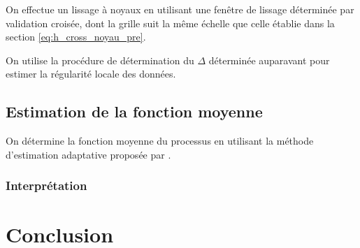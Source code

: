 On effectue un lissage à noyaux en utilisant une fenêtre de lissage déterminée par validation croisée, dont la grille suit la même échelle que celle établie dans la section \ref{eq:h_cross_noyau_pre}.


On utilise la procédure de détermination du $\Delta$ déterminée auparavant pour estimer la régularité locale des données.

\subsection{Estimation de la fonction moyenne}

On détermine la fonction moyenne du processus en utilisant la méthode d'estimation adaptative proposée par \cite{golovkine2021adaptive}.

\subsubsection{Interprétation}


\section{Conclusion}

